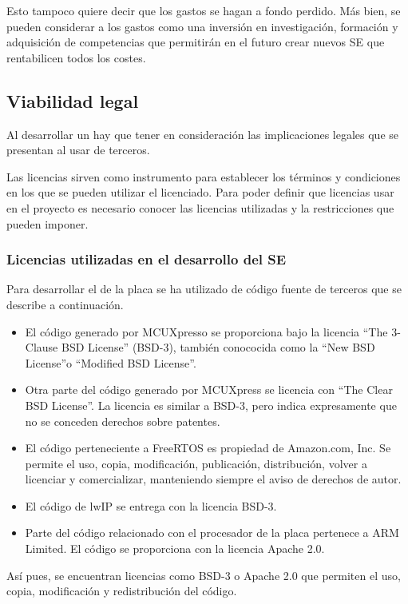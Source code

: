 Esto tampoco quiere decir que los gastos se hagan a fondo perdido. Más bien,
se pueden considerar a los gastos como una inversión en investigación, formación
y adquisición de competencias que permitirán en el futuro crear nuevos SE que
rentabilicen todos los costes.


\subsection{Viabilidad legal}
Al desarrollar un  hay que tener en consideración
las implicaciones legales que se presentan al usar 
de terceros.

Las licencias sirven como instrumento para establecer los términos y condiciones
en los que se pueden utilizar el  licenciado. Para
poder definir que licencias usar en el proyecto es necesario conocer las
licencias utilizadas y la restricciones que pueden imponer.

\subsubsection{Licencias utilizadas en el desarrollo del SE}
Para desarrollar el  de la placa se ha utilizado
de código fuente de terceros que se describe a continuación.
\begin{itemize}
  \item El código generado por MCUXpresso se proporciona bajo la licencia
  ``The 3-Clause BSD License'' (BSD-3), también conococida como la
  ``New BSD License''o ``Modified BSD License''.
  \item Otra parte del código generado por MCUXpress se licencia con 
  ``The Clear BSD License''. La licencia es similar a BSD-3, pero indica
  expresamente que no se conceden derechos sobre patentes.
  \item El código perteneciente a FreeRTOS es propiedad de Amazon.com, Inc.
  Se permite el uso, copia, modificación, publicación, distribución, volver a
  licenciar y comercializar, manteniendo siempre el aviso de derechos de autor.
  \item El código de lwIP se entrega con la licencia BSD-3.
  \item Parte del código relacionado con el procesador de la placa pertenece a
  ARM Limited. El código se proporciona con la licencia Apache 2.0.
\end{itemize}

Así pues, se encuentran licencias como BSD-3 o Apache 2.0 que permiten el uso,
copia, modificación y redistribución del código.

